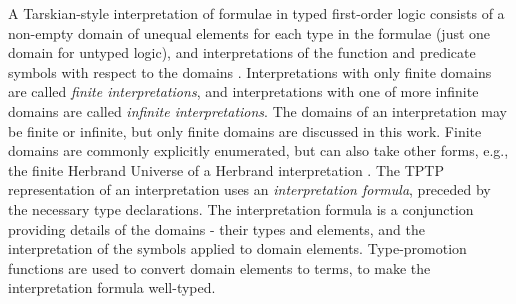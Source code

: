 \documentclass[letterpaper]{article}
\newcommand{\smalltt}[1]{\small \texttt{#1}}
\newenvironment{packed_itemize}{
\vspace*{-0.2em}
\begin{itemize}
\setlength{\partopsep}{0pt}
\setlength{\itemsep}{1pt}
\setlength{\parskip}{0pt}
\setlength{\parsep}{0pt}
}{\end{itemize}}
\begin{document}
{A Tarskian-style interpretation \cite{TV56} of formulae in typed first-order logic consists of a 
non-empty domain of unequal elements for each type in the formulae (just one domain for 
untyped logic), and interpretations of the function and predicate symbols with respect to the 
domains \cite{Hun96}.
Interpretations with only finite domains are called {\em finite interpretations}, and
interpretations with one of more infinite domains are called {\em infinite interpretations}.
The domains of an interpretation may be finite or infinite, but only finite domains are discussed
in this work.
Finite domains are commonly explicitly enumerated, but can also take other forms, e.g., the 
finite Herbrand Universe of a Herbrand interpretation \cite{Her30}.
The TPTP representation of an interpretation uses an {\em interpretation formula}, preceded by 
the necessary type declarations.
The interpretation formula is a conjunction providing details of the domains - their types and 
elements, and the interpretation of the symbols applied to domain elements.
Type-promotion functions are used to convert domain elements to terms, to make the
interpretation formula well-typed.
}
\end{document}
